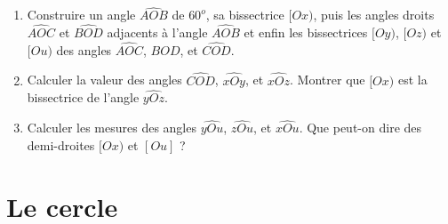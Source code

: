 \documentclass[12 pt]{report}
\theoremstyle{plain}
\newcounter{n}
\begin{document}
\begin{enumerate}
\begin{enumerate}
\item Construire un angle $\widehat{AOB}$ de $60^o$, sa bissectrice $[Ox)$, puis les angles droits $\widehat{AOC}$ et $\widehat{BOD}$ adjacents à l'angle $\widehat{AOB}$ et enfin les bissectrices $[Oy)$, $[Oz)$ et $[Ou)$ des angles $\widehat{AOC}$, $\widehat{BOD}$, et $\widehat{COD}$. 
\item Calculer la valeur des angles $\widehat{COD}$, $\widehat{xOy}$, et $\widehat{xOz}$. Montrer que $[Ox)$ est la bissectrice de l'angle $\widehat{yOz}$. 
\item Calculer les mesures des angles $\widehat{yOu}$, $\widehat{zOu}$, et $\widehat{xOu}$. Que peut-on dire des demi-droites $[Ox)$ et $[Ou]$ ? 
\end{enumerate}

\end{enumerate}
\chapter{Le cercle} 
\end{document}
